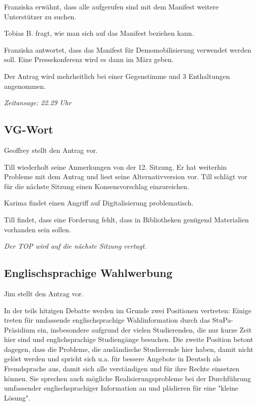 \documentclass[ngerman,headheight=70pt]{scrartcl}
\begin{document}
    Franziska erwähnt, dass alle aufgerufen sind mit dem Manifest weitere Unterstützer
    zu suchen.

    Tobias B. fragt, wie man sich auf das Manifest beziehen kann.

    Franziska antwortet, dass das Manifest für Demomobilisierung verwendet werden
    soll. Eine Pressekonferenz wird es dann im März geben.

    Der Antrag wird mehrheitlich bei einer Gegenstimme und 3 Enthaltungen
    angenommen.

    \textit{Zeitansage: 22.29 Uhr}
    \subsection{VG-Wort}

    Geoffrey stellt den Antrag vor.

    Till wiederholt seine Anmerkungen von der 12. Sitzung. Er hat weiterhin Probleme
    mit dem Antrag und liest seine Alternativversion vor. Till schlägt vor
    für die nächste Sitzung einen Konsensvorschlag einzureichen.

    Karima findet einen Angriff auf Digitalisierung problematisch.

    Till findet, dass eine Forderung fehlt, dass in Bibliotheken genügend
    Materialien vorhanden sein sollen.

    \textit{Der TOP wird auf die nächste Sitzung vertagt.}

    \subsection{Englischsprachige Wahlwerbung}

    Jim stellt den Antrag vor.

    In der teils hitzigen Debatte werden im Grunde zwei Positionen vertreten:
    Einige treten für umfassende englischsprachige Wahlinformation durch das
    StuPa-Präsidium ein, insbesondere aufgrund der vielen Studierenden, die nur
    kurze Zeit hier sind und englichsprachige Studiengänge besuchen. Die zweite
    Position betont dagegen, dass die Probleme, die ausländische Studierende hier
    haben, damit nicht gelöst werden und spricht sich u.a. für bessere Angebote
    in Deutsch als Fremdsprache aus, damit sich alle verständigen und für ihre
    Rechte einsetzen können. Sie sprechen auch mögliche Realisierungsprobleme bei
    der Durchführung umfassender englischsprachiger Information an und plädieren
    für eine "kleine Lösung".
\end{document}
